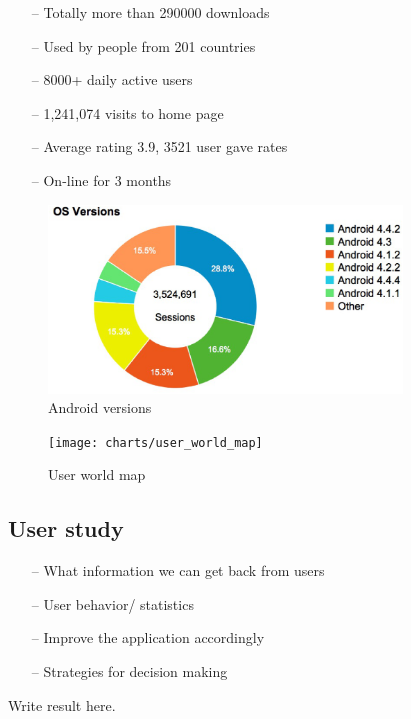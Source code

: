 \begin{itemize}
\item[--]Totally more than 290000 downloads
\item[--]Used by people from 201 countries
\item[--]8000+ daily active users
\item[--]1,241,074 visits to home page
\item[--]Average rating 3.9, 3521 user gave rates
\item[--]On-line for 3 months
\end{itemize}
\begin{figure}[htb]
\centering \includegraphics[height=5cm]{charts/android_versions}
\caption{Android versions \label{chart6}}
\end{figure}

\begin{figure}[htb]
\centering \texttt{[image: charts/user\_world\_map]}
\caption{User world map \label{chart7}}
\end{figure}

\begin{table}[htb]
\caption{Receiver type statistic \label{Table8}}
\begin{center}
\end{center}
\end{table}

\subsection{User study}
\begin{itemize}
\item[--]What information we can get back from users
\item[--]User behavior/ statistics
\item[--]Improve the application accordingly
\item[--]Strategies for decision making
\end{itemize}
Write result here.
